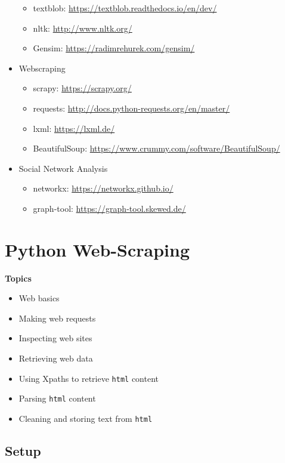 \documentclass[]{book}
\providecommand{\tightlist}{%
  \setlength{\itemsep}{0pt}\setlength{\parskip}{0pt}}
\begin{document}
\begin{itemize}
  \begin{itemize}
  \tightlist
  \item
    textblob: \url{https://textblob.readthedocs.io/en/dev/}
  \item
    nltk: \url{http://www.nltk.org/}
  \item
    Gensim: \url{https://radimrehurek.com/gensim/}
  \end{itemize}
\item
  Webscraping

  \begin{itemize}
  \tightlist
  \item
    scrapy: \url{https://scrapy.org/}
  \item
    requests: \url{http://docs.python-requests.org/en/master/}
  \item
    lxml: \url{https://lxml.de/}
  \item
    BeautifulSoup: \url{https://www.crummy.com/software/BeautifulSoup/}
  \end{itemize}
\item
  Social Network Analysis

  \begin{itemize}
  \tightlist
  \item
    networkx: \url{https://networkx.github.io/}
  \item
    graph-tool: \url{https://graph-tool.skewed.de/}
  \end{itemize}
\end{itemize}

\chapter{Python Web-Scraping}\label{python-web-scraping}

\textbf{Topics}

\begin{itemize}
\tightlist
\item
  Web basics
\item
  Making web requests
\item
  Inspecting web sites
\item
  Retrieving web data
\item
  Using Xpaths to retrieve \texttt{html} content
\item
  Parsing \texttt{html} content
\item
  Cleaning and storing text from \texttt{html}
\end{itemize}

\section{Setup}\label{setup-5}
\end{document}
